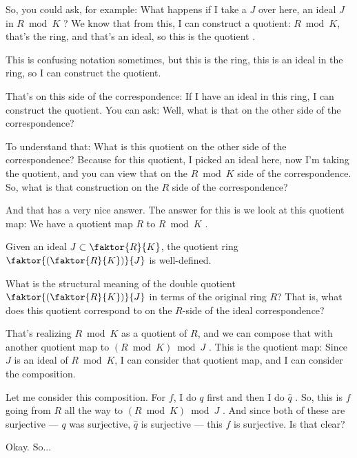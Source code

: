\begin{speech}[00:02:37 - 00:03:48]
So, you could ask, for example: What happens if I take a $J$ over here, an ideal $J$ in $R \bmod K$ ? We know that from this, I can construct a quotient: $R \bmod K$, that's the ring, and that's an ideal, so this is the quotient .

This is confusing notation sometimes, but this is the ring, this is an ideal in the ring, so I can construct the quotient.

That's on this side of the correspondence: If I have an ideal in this ring, I can construct the quotient. You can ask: Well, what is that on the other side of the correspondence?

To understand that: What is this quotient on the other side of the correspondence?  Because for this quotient, I picked an ideal here, now I'm taking the quotient, and you can view that on the $R \bmod K$ side of the correspondence. So, what is that construction on the $R$ side of the correspondence?

And that has a very nice answer. The answer for this is we look at this quotient map: We have a quotient map $R$ to $R \bmod K$ .
\end{speech}

\begin{content}
Given an ideal $J \subset \faktor{R}{K}$, the quotient ring $\faktor{(\faktor{R}{K})}{J}$ is well-defined.
\begin{question}
What is the structural meaning of the double quotient $\faktor{(\faktor{R}{K})}{J}$ in terms of the original ring $R$? That is, what does this quotient correspond to on the $R$-side of the ideal correspondence?
\end{question}
\end{content}

\begin{speech}[00:03:48 - 00:05:06]
That's realizing $R \bmod K$ as a quotient of $R$, and we can compose that with another quotient map to $(R \bmod K) \bmod J$ . This is the quotient map: Since $J$ is an ideal of $R \bmod K$, I can consider that quotient map, and I can consider the composition.

Let me consider this composition. For $f$, I do $q$ first and then I do $\hat{q}$ . So, this is $f$ going from $R$ all the way to $(R \bmod K) \bmod J$ . And since both of these are surjective --- $q$ was surjective, $\hat{q}$ is surjective --- this $f$ is surjective. Is that clear? 

Okay. So...
\end{speech}

